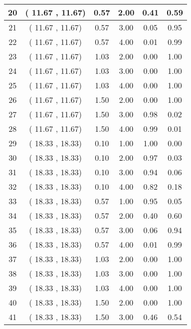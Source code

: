 \begin{center}
\begin{table}
\begin{tabular}{|cccccc|}
20 & (   11.67 ,    11.67) &     0.57 &     2.00 &     0.41 &     0.59 \\  \hline
21 & (   11.67 ,    11.67) &     0.57 &     3.00 &     0.05 &     0.95 \\  \hline
22 & (   11.67 ,    11.67) &     0.57 &     4.00 &     0.01 &     0.99 \\  \hline
23 & (   11.67 ,    11.67) &     1.03 &     2.00 &     0.00 &     1.00 \\  \hline
24 & (   11.67 ,    11.67) &     1.03 &     3.00 &     0.00 &     1.00 \\  \hline
25 & (   11.67 ,    11.67) &     1.03 &     4.00 &     0.00 &     1.00 \\  \hline
26 & (   11.67 ,    11.67) &     1.50 &     2.00 &     0.00 &     1.00 \\  \hline
27 & (   11.67 ,    11.67) &     1.50 &     3.00 &     0.98 &     0.02 \\  \hline
28 & (   11.67 ,    11.67) &     1.50 &     4.00 &     0.99 &     0.01 \\  \hline
29 & (   18.33 ,    18.33) &     0.10 &     1.00 &     1.00 &     0.00 \\  \hline
30 & (   18.33 ,    18.33) &     0.10 &     2.00 &     0.97 &     0.03 \\  \hline
31 & (   18.33 ,    18.33) &     0.10 &     3.00 &     0.94 &     0.06 \\  \hline
32 & (   18.33 ,    18.33) &     0.10 &     4.00 &     0.82 &     0.18 \\  \hline
33 & (   18.33 ,    18.33) &     0.57 &     1.00 &     0.95 &     0.05 \\  \hline
34 & (   18.33 ,    18.33) &     0.57 &     2.00 &     0.40 &     0.60 \\  \hline
35 & (   18.33 ,    18.33) &     0.57 &     3.00 &     0.06 &     0.94 \\  \hline
36 & (   18.33 ,    18.33) &     0.57 &     4.00 &     0.01 &     0.99 \\  \hline
37 & (   18.33 ,    18.33) &     1.03 &     2.00 &     0.00 &     1.00 \\  \hline
38 & (   18.33 ,    18.33) &     1.03 &     3.00 &     0.00 &     1.00 \\  \hline
39 & (   18.33 ,    18.33) &     1.03 &     4.00 &     0.00 &     1.00 \\  \hline
40 & (   18.33 ,    18.33) &     1.50 &     2.00 &     0.00 &     1.00 \\  \hline
41 & (   18.33 ,    18.33) &     1.50 &     3.00 &     0.46 &     0.54 \\  \hline

\end{tabular}
\end{table}
\end{center}
